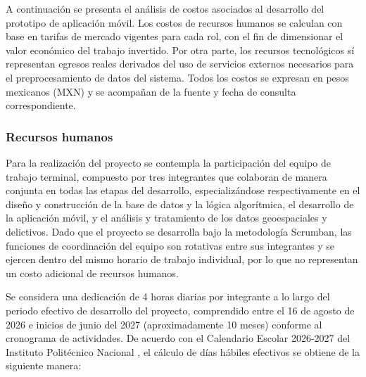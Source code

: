 A continuación se presenta el análisis de costos asociados al desarrollo del prototipo de aplicación móvil. Los costos de recursos humanos se calculan con base en tarifas de mercado vigentes para cada rol, con el fin de dimensionar el valor económico del trabajo invertido. Por otra parte, los recursos tecnológicos sí representan egresos reales derivados del uso de servicios externos necesarios para el preprocesamiento de datos del sistema. Todos los costos se expresan en pesos mexicanos (MXN) y se acompañan de la fuente y fecha de consulta correspondiente.

\subsubsection{Recursos humanos}

Para la realización del proyecto se contempla la participación del equipo de trabajo terminal, compuesto por tres integrantes que colaboran de manera conjunta en todas las etapas del desarrollo, especializándose respectivamente en el diseño y construcción de la base de datos y la lógica algorítmica, el desarrollo de la aplicación móvil, y el análisis y tratamiento de los datos geoespaciales y delictivos. Dado que el proyecto se desarrolla bajo la metodología Scrumban, las funciones de coordinación del equipo son rotativas entre sus integrantes y se ejercen dentro del mismo horario de trabajo individual, por lo que no representan un costo adicional de recursos humanos.





Se considera una dedicación de 4 horas diarias por integrante a lo largo del periodo 
efectivo de desarrollo del proyecto, comprendido entre el 16 de agosto de 2026 e inicios de junio del 2027 (aproximadamente 10 meses) conforme al cronograma de actividades. De acuerdo con el Calendario Escolar 2026-2027 del Instituto Politécnico Nacional \cite{ipn_calendario2026}, el cálculo de días hábiles efectivos se obtiene de la siguiente manera:



